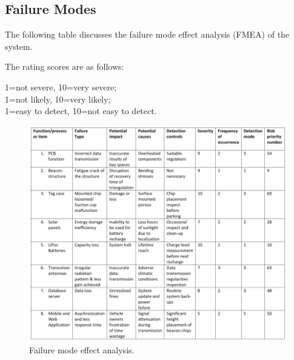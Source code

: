 \newpage
\subsection{Failure Modes}
The following table discusses the failure mode effect analysis (FMEA) of the system.\cite{FMEA} 

The rating scores are as follows:

1=not severe, 10=very severe; \\
1=not likely, 10=very likely; \\
1=easy to detect, 10=not easy to detect. \\

\begin{figure}[H]
\begin{center}
\includegraphics[scale=0.6]{data/failure-modes.png}
\caption{Failure mode effect analysis.}
\label{fig:failure}
\end{center}
\end{figure}

